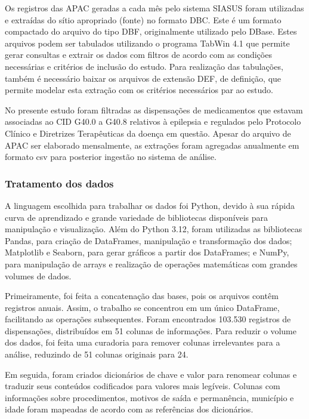 \documentclass[article,a4paper,12pt,brazil,sumario=tradicional]{abntex2}
\begin{document}
Os registros das APAC geradas a cada mês pelo sistema SIASUS foram utilizadas e extraídas do sítio apropriado (fonte) no formato DBC. Este é um formato compactado do arquivo do tipo DBF, originalmente utilizado pelo DBase. Estes arquivos podem ser tabulados utilizando o programa TabWin 4.1 que permite gerar consultas e extrair os dados com filtros de acordo com as condições necessárias e critérios de inclusão do estudo. Para realização das tabulações, também é necessário baixar os arquivos de extensão DEF, de definição, que permite modelar esta extração com os critérios necessários par ao estudo.

No presente estudo foram filtradas as dispensações de medicamentos que estavam associadas ao CID G40.0 a G40.8 relativos à epilepsia e regulados pelo Protocolo Clínico e Diretrizes Terapêuticas da doença em questão. Apesar do arquivo de APAC ser elaborado mensalmente, as extrações foram agregadas anualmente em formato csv para posterior ingestão no sistema de análise.

\subsubsection{Tratamento dos dados}
 
A linguagem escolhida para trabalhar os dados foi Python, devido à sua rápida curva de aprendizado e grande variedade de bibliotecas disponíveis para manipulação e visualização. Além do Python 3.12, foram utilizadas as bibliotecas Pandas, para criação de DataFrames, manipulação e transformação dos dados; Matplotlib e Seaborn, para gerar gráficos a partir dos DataFrames; e NumPy, para manipulação de arrays e realização de operações matemáticas com grandes volumes de dados.

Primeiramente, foi feita a concatenação das bases, pois os arquivos contêm registros anuais. Assim, o trabalho se concentrou em um único DataFrame, facilitando as operações subsequentes. Foram encontrados 103.530 registros de dispensações, distribuídos em 51 colunas de informações. Para reduzir o volume dos dados, foi feita uma curadoria para remover colunas irrelevantes para a análise, reduzindo de 51 colunas originais para 24.

Em seguida, foram criados dicionários de chave e valor para renomear colunas e traduzir seus conteúdos codificados para valores mais legíveis. Colunas com informações sobre procedimentos, motivos de saída e permanência, município e idade foram mapeadas de acordo com as referências dos dicionários.
\end{document}
